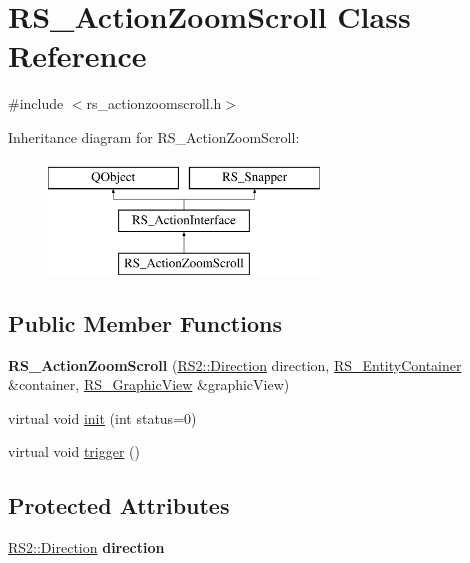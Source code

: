 \hypertarget{classRS__ActionZoomScroll}{\section{R\-S\-\_\-\-Action\-Zoom\-Scroll Class Reference}
\label{classRS__ActionZoomScroll}
}


{\ttfamily \#include $<$rs\-\_\-actionzoomscroll.\-h$>$}

Inheritance diagram for R\-S\-\_\-\-Action\-Zoom\-Scroll\-:\begin{figure}[H]
\begin{center}
\leavevmode
\includegraphics[height=3.000000cm]{classRS__ActionZoomScroll}
\end{center}
\end{figure}
\subsection*{Public Member Functions}
\begin{DoxyCompactItemize}
\item 
\hypertarget{classRS__ActionZoomScroll_aad2b37e1f59ab9545e4d1f75e220f9f4}{{\bfseries R\-S\-\_\-\-Action\-Zoom\-Scroll} (\hyperlink{classRS2_a6b01552307ddf2599503c2e2f6ae7066}{R\-S2\-::\-Direction} direction, \hyperlink{classRS__EntityContainer}{R\-S\-\_\-\-Entity\-Container} \&container, \hyperlink{classRS__GraphicView}{R\-S\-\_\-\-Graphic\-View} \&graphic\-View)}\label{classRS__ActionZoomScroll_aad2b37e1f59ab9545e4d1f75e220f9f4}

\item 
virtual void \hyperlink{classRS__ActionZoomScroll_a77788f0954b7442c2d1f21d3bcb84336}{init} (int status=0)
\item 
virtual void \hyperlink{classRS__ActionZoomScroll_afb58478c72ca2ccc224e5e5c3b3bf580}{trigger} ()
\end{DoxyCompactItemize}
\subsection*{Protected Attributes}
\begin{DoxyCompactItemize}
\item 
\hypertarget{classRS__ActionZoomScroll_adbbec3ffa4ac4d2468c38e67bb03f33c}{\hyperlink{classRS2_a6b01552307ddf2599503c2e2f6ae7066}{R\-S2\-::\-Direction} {\bfseries direction}}\label{classRS__ActionZoomScroll_adbbec3ffa4ac4d2468c38e67bb03f33c}

\end{DoxyCompactItemize}
